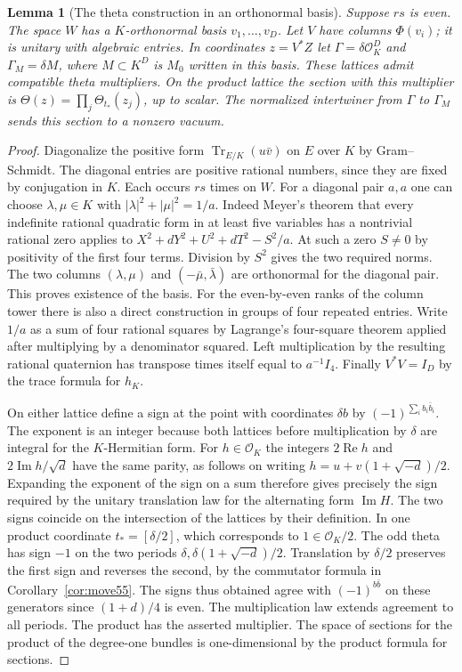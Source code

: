 \documentclass[a4paper,11pt]{article}
\newtheorem{lemma}[proposition]{Lemma}
\theoremstyle{definition}
\theoremstyle{remark}
\newcommand{\real}{\operatorname{Re}}\newcommand{\imag}{\operatorname{Im}}
\numberwithin{equation}{section}
\newcommand{\OO}{\mathcal O}
\begin{document}
\begin{lemma}[The theta construction in an orthonormal basis]\label{lem:basis59}
Suppose \(rs\) is even. The space \(W\) has a \(K\)-orthonormal
basis \(v_1,\ldots,v_D\). Let \(V\) have columns \(\Phi(v_i)\);
it is unitary with algebraic entries. In coordinates \(z=V^*Z\)
let \(\Gamma=\delta\OO_K^D\) and
\(\Gamma_M=\delta M\), where \(M\subset K^D\) is \(M_0\) written
in this basis. These lattices admit compatible theta multipliers.
On the product lattice the section with this multiplier is
\(\Theta(z)=\prod_j\Theta_{t_*}(z_j)\), up to scalar.
The normalized intertwiner from \(\Gamma\) to \(\Gamma_M\)
sends this section to a nonzero vacuum.
\end{lemma}
\begin{proof}
Diagonalize the positive form \(\operatorname{Tr}_{E/K}(u\bar v)\)
on \(E\) over \(K\) by Gram--Schmidt. The diagonal entries are
positive rational numbers, since they are fixed by conjugation
in \(K\). Each occurs \(rs\) times on \(W\). For a diagonal pair
\(a,a\) one can choose \(\lambda,\mu\in K\) with
\(|\lambda|^2+|\mu|^2=1/a\). Indeed Meyer's theorem that
every indefinite rational quadratic form in at least five
variables has a nontrivial rational zero applies to
\(X^2+dY^2+U^2+dT^2-S^2/a\). At such a zero \(S\ne0\) by
positivity of the first four terms. Division by \(S^2\) gives the
two required norms. The two columns
\((\lambda,\mu)\) and \((-\bar\mu,\bar\lambda)\) are orthonormal
for the diagonal pair. This proves existence of the basis.
For the even-by-even ranks of the column tower there is also a
direct construction in groups of four repeated entries. Write
\(1/a\) as a sum of four rational squares by Lagrange's
four-square theorem applied after multiplying by a denominator
squared. Left multiplication by the resulting rational quaternion
has transpose times itself equal to \(a^{-1}I_4\).
Finally \(V^*V=I_D\) by the trace formula for \(h_K\).

On either lattice define a sign at the point with coordinates
\(\delta b\) by \((-1)^{\sum_i b_i\bar b_i}\).
The exponent is an integer because both lattices before multiplication
by \(\delta\) are integral for the \(K\)-Hermitian form.
For \(h\in\OO_K\) the integers \(2\real h\) and
\(2\imag h/\sqrt d\) have the same parity, as follows on writing
\(h=u+v(1+\sqrt{-d})/2\). Expanding the exponent of the sign on
a sum therefore gives precisely the sign required by the unitary
translation law for the alternating form \(\imag H\). The two
signs coincide on the intersection of the lattices by their
definition. In one product coordinate \(t_*=[\delta/2]\), which
corresponds to \(1\in\OO_K/2\). The odd theta has sign \(-1\)
on the two periods \(\delta,\delta(1+\sqrt{-d})/2\). Translation
by \(\delta/2\) preserves the first sign and reverses the second,
by the commutator formula in Corollary~\ref{cor:move55}. The signs
thus obtained agree with \((-1)^{b\bar b}\) on these generators
since \((1+d)/4\) is even. The multiplication law extends agreement
to all periods. The product has the asserted multiplier.
The space of sections for the product of the degree-one bundles
is one-dimensional by the product formula for sections.


\end{proof}
\end{document}
